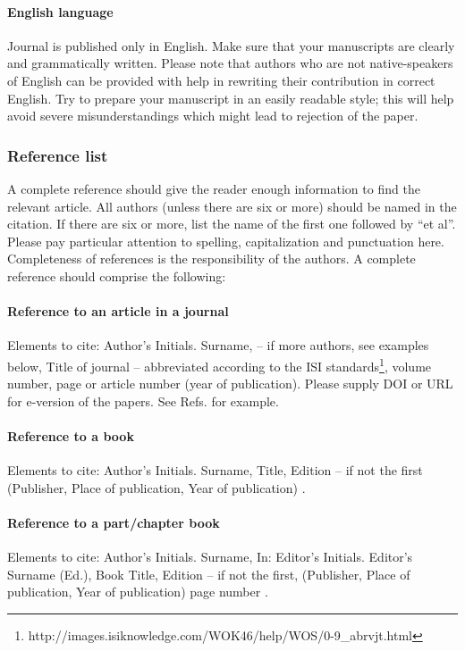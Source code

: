 \documentclass[USenglish,oneside,twocolumn]{article}
\begin{document}
\paragraph{English language}
 Journal     is published only in English. Make sure that your manuscripts are clearly and grammatically written. Please note that authors who are not native-speakers of English can be provided with help in rewriting their contribution in correct English. Try to prepare your manuscript in an easily readable style; this will help avoid severe misunderstandings which might lead to rejection of the paper.

\subsubsection{Reference list}

A complete reference should give the reader enough information to find the relevant article. All authors (unless there are six or more) should be named in the citation. If there are six or more, list the name of the first one followed by ``et al''. Please pay particular attention to spelling, capitalization and punctuation here. Completeness of references is the responsibility of the authors. A complete reference should comprise the following:

\paragraph{Reference to an article in a journal}
Elements to cite:
Author's Initials. Surname, -- if more authors, see examples below,
Title of journal -- abbreviated according to the ISI standards\footnote{ http://images.isiknowledge.com/WOK46/help/WOS/0-9\_abrvjt.html},
volume number, page or article number (year of publication).
Please supply DOI or URL for e-version of the papers.
See Refs. \cite{journal-1, journal-2, journal-3, journal-4, journal-5, journal-6, journal-7, journal-8} for example.

\paragraph{Reference to a book}
Elements to cite:
Author's Initials. Surname,
Title,
Edition -- if not the first
(Publisher, Place of publication, Year of publication)
\cite{book}.


\paragraph{Reference to a part/chapter book}
Elements to cite:
Author's Initials. Surname,
In: Editor's Initials. Editor's Surname (Ed.),
Book Title,
Edition -- if not the first,
(Publisher, Place of publication, Year of publication)
page number \cite{chapter}.
\end{document}
